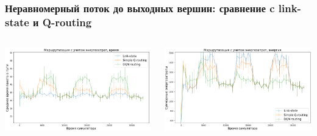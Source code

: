 \documentclass{beamer}
\begin{document}

\begin{frame}
  \frametitle{Неравномерный поток до выходных вершин: сравнение c link-state и Q-routing}
  \begin{columns}
    \begin{column}{0.5\textwidth}
      \includegraphics[width=\textwidth]{experiment-conveyors-en1-time}
    \end{column}
    \begin{column}{0.5\textwidth}
      \includegraphics[width=\textwidth]{experiment-conveyors-en1-energy}
    \end{column}
  \end{columns}
\end{frame}

\end{document}
